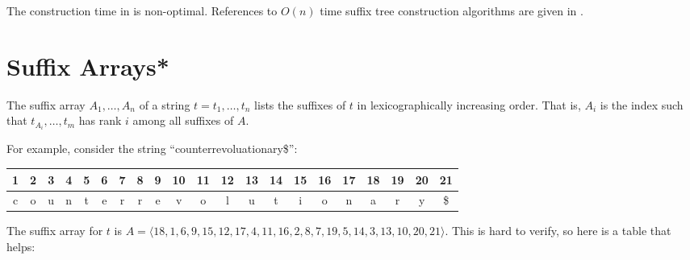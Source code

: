 The construction time in  is non-optimal.
References to $O(n)$ time suffix tree construction algorithms are given
in .


\section{Suffix Arrays*}

The suffix array $A_1,\ldots,A_n$ of a string $t=t_1,\ldots,t_n$ lists
the suffixes of $t$ in lexicographically increasing order.  That is,
$A_i$ is the index such that $t_{A_{i}},\ldots,t_m$ has rank $i$ among
all suffixes of $A$.  

For example, consider the string ``counterrevoluationary\$'':
\begin{center}
  \begin{tabular}{|c|c|c|c|c|c|c|c|c|c|c|c|c|c|c|c|c|c|c|c|c|}\hline
     1&2&3&4&5&6&7&8&9&10&11&12&13&14&15&16&17&18&19&20&21\\\hline
     c&o&u&n&t&e&r&r&e&v&o&l&u&t&i&o&n&a&r&y&\$\\\hline
  \end{tabular}
\end{center}
The suffix array for $t$ is
$A=\langle18,1,6,9,15,12,17,4,11,16,2,8,7,19,5,14,3,13,10,20,21\rangle$.  This is hard to verify, so here is a table that helps:

